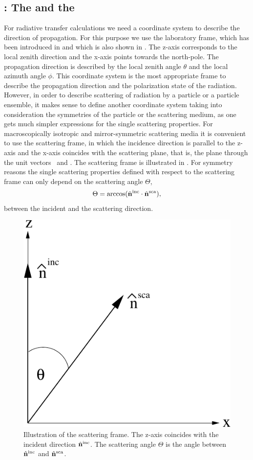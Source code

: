 \subsection[Coordinate systems]{: The
   and the  }
\label{sec:clouds:coordinate_sytems}

For radiative transfer calculations we need a coordinate system to
describe the direction of propagation. For this purpose we use the
laboratory frame, which has been introduced in
 and which is also shown in .
The z-axis corresponds to the local zenith direction and the x-axis
points towards the north-pole. The propagation direction is described
by the local zenith angle $\theta$ and the local azimuth angle $\phi$.
This coordinate system is the most appropriate frame to describe the
propagation direction and the polarization state of the radiation.
However, in order to describe scattering of radiation by a particle or
a particle ensemble, it makes sense to define another coordinate
system taking into consideration the symmetries of the particle or the
scattering medium, as one gets much simpler expressions for the single
scattering properties.  For macroscopically isotropic and
mirror-symmetric scattering media it is convenient to use the
scattering frame, in which the incidence direction is parallel to the
z-axis and the x-axis coincides with the scattering plane, that is,
the plane through the unit vectors \ and
. The scattering frame is illustrated in
. For symmetry reasons the single scattering
properties defined with respect to the scattering frame can only
depend on the scattering angle $\Theta$,
\begin{equation}
  \label{eq:scat_angle}
  \Theta=\arccos(\hat{{\bf n}}^{\mathrm{inc}} \cdot {\hat{\ensuremath{{\bf n}}}^{\mathrm{sca}}}),
\end{equation}
between the incident and the scattering direction.

\begin{figure}[htbp]
 \begin{center}
   \includegraphics*[width=0.4\hsize]{part_frame}
   \caption{Illustration of the scattering frame. The z-axis coincides with the incident direction $\hat{{\bf n}}^{\mathrm{inc}}$. The scattering angle $\Theta$ is the angle between  $\hat{{\bf n}}^{\mathrm{inc}}$ and $\hat{{\bf n}}^{\mathrm{sca}}$.}
   \label{fig:scattering:part_frame}  
 \end{center}
\end{figure}

